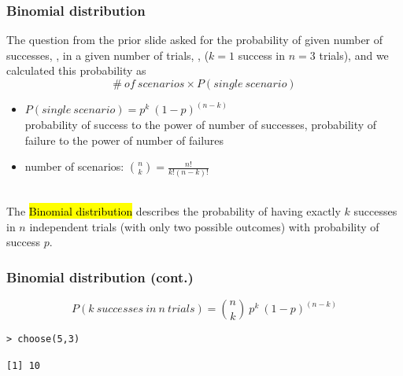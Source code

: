 \documentclass[slidestop,compress,mathserif,12pt,t,professionalfonts,xcolor=table]{beamer}
\begin{document}

\begin{frame}
\frametitle{Binomial distribution}

The question from the prior slide asked for the probability of given number of successes, , in a given number of trials, , ($k = 1$ success in $n = 3$ trials), and we calculated this probability as
\[ \#~of~scenarios \times P(single~scenario) \]

\pause

\begin{itemize}

\item $P(single~scenario) = p^k~(1-p)^{(n-k)}$ \\
{\tiny probability of success to the power of number of successes, probability of failure to the power of number of failures}

\pause

\item number of scenarios: ${n \choose k} = \frac{n!}{k! (n - k)!}$

\end{itemize}

\pause
$\:$ \\

The \hl{Binomial distribution} describes the probability of having exactly $k$ successes in $n$ independent trials (with only two possible outcomes) with probability of success $p$.

\end{frame}


\begin{frame}[fragile]
\frametitle{Binomial distribution (cont.)}

\[P(k~successes~in~n~trials) = {n \choose k}~p^k~(1-p)^{(n-k)} \] 

\pause

{\footnotesize
\begin{Verbatim}[frame=single, formatcom=\color{blue}]
> choose(5,3)
\end{Verbatim}
}
{\footnotesize
\begin{Verbatim}[frame=single, formatcom=\color{gray}]
[1] 10
\end{Verbatim}
}

\end{frame}

\end{document}
